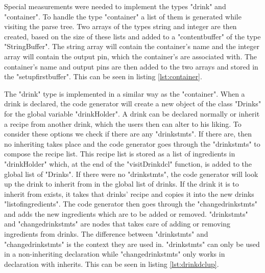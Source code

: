 
Special measurements were needed to implement the types "drink" and "container". To handle the type "container" a list of them is generated while visiting the parse tree. Two arrays of the types string and integer are then created, based on the size of these lists and added to a "contentbuffer" of the type "StringBuffer". The string array will contain the container's name and the integer array will contain the output pin, which the container's are associated with. The container's name and output pins are then added to the two arrays and stored in the "setupfirstbuffer". This can be seen in listing \ref{lst:container}.


The "drink" type is implemented in a similar way as the "container". When a drink is declared, the code generator will create a new object of the class "Drinks" for the global variable "drinkHolder". A drink can be declared normally or inherit a recipe from another drink, which the users then can alter to his liking. To consider these options we check if there are any "drinkstmts". If there are, then no inheriting takes place and the code generator goes through the "drinkstmts" to compose the recipe list. This recipe list is stored as a list of ingredients in "drinkHolder" which, at the end of the "visitDrinkdcl" function, is added to the global list of "Drinks". If there were no "drinkstmts", the code generator will look up the drink to inherit from in the global list of drinks. If the drink it is to inherit from exists, it takes that drinks' recipe and copies it into the new drinks "listofingredients". The code generator then goes through the "changedrinkstmts" and adds the new ingredients which are to be added or removed. "drinkstmts" and "changedrinkstmts" are nodes that takes care of adding or removing ingredients from drinks. The difference between "drinkstmts" and "changedrinkstmts" is the context they are used in. "drinkstmts" can only be used in a non-inheriting declaration while "changedrinkstmts" only works in declaration with inherits. This can be seen in listing \ref{lst:drinkdclup}.




